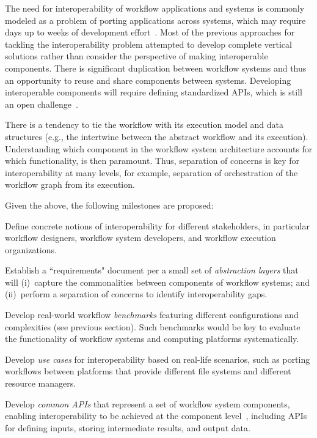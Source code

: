 The need for interoperability of workflow applications and systems is commonly modeled as a problem of porting applications across systems, which may require days up to weeks of development effort~\cite{schiefer2020portability,LFB+21}. Most of the previous approaches for tackling the interoperability problem attempted to develop complete vertical solutions rather than consider the perspective of making interoperable components. There is significant duplication between workflow systems and thus an opportunity to reuse and share components between systems. Developing interoperable components 
will require defining standardized APIs, which is still an open challenge~\cite{turilli2019middleware, billings2017toward}. 

There is a tendency to tie the workflow with its execution model and data structures (e.g., the intertwine between the abstract workflow and its execution). Understanding which component in the workflow system architecture accounts for which functionality, is then paramount. Thus, separation of concerns is key for interoperability at many levels, for example, separation of orchestration of the workflow graph from its execution.

Given the above, the following milestones are proposed:

Define concrete notions of interoperability for different stakeholders, in particular workflow designers, workflow system developers, and workflow execution organizations.

Establish a ``requirements" document per a small set of \emph{abstraction layers} that will (i)~capture the commonalities between components of workflow systems; and (ii)~perform a separation of concerns to identify interoperability gaps.

Develop real-world workflow \emph{benchmarks} featuring different configurations and complexities (see previous section). Such benchmarks would be key to evaluate the functionality of workflow systems and computing platforms systematically.

Develop \emph{use cases} for interoperability based on real-life scenarios, such as porting workflows between platforms that provide different file systems and different resource managers.

Develop \emph{common APIs} that represent a set of workflow system components, enabling interoperability to be achieved at the component level~\cite{cwl, arshad2015definition, Fursin_2021}, including APIs for defining inputs, storing intermediate results, and output data.

